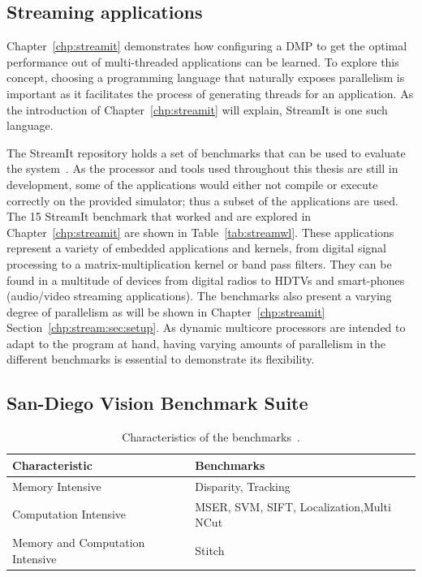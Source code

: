 \subsection{Streaming applications}\label{chp:setup:streamit}

Chapter~\ref{chp:streamit} demonstrates how configuring a DMP to get the optimal performance out of multi-threaded applications can be learned.
To explore this concept, choosing a programming language that naturally exposes parallelism is important as it facilitates the process of generating threads for an application.
As the introduction of Chapter~\ref{chp:streamit} will explain, StreamIt is one such language.

The StreamIt repository holds a set of benchmarks that can be used to evaluate the system~\cite{streamitrepo}.
As the processor and tools used throughout this thesis are still in development, some of the applications would either not compile or execute correctly on the provided simulator; thus a subset of the applications are used.
The 15 StreamIt benchmark that worked and are explored in Chapter~\ref{chp:streamit} are shown in Table~\ref{tab:streamwl}.
These applications represent a variety of embedded applications and kernels, from digital signal processing to a matrix-multiplication kernel or band pass filters.
They can be found in a multitude of devices from digital radios to HDTVs and smart-phones (audio/video streaming applications).
The benchmarks also present a varying degree of parallelism as will be shown in Chapter~\ref{chp:streamit} Section~\ref{chp:stream:sec:setup}.
As dynamic multicore processors are intended to adapt to the program at hand, having varying amounts of parallelism in the different benchmarks is essential to demonstrate its flexibility.

\subsection{San-Diego Vision Benchmark Suite}\label{chp:setup:sdvbs}
\begin{table}[t]
  \smaller
  \centering
 \begin{tabular} { | l | l | }
 \hline
   \cellcolor[gray]{0.7}Characteristic & \cellcolor[gray]{0.7} Benchmarks\\ \hline
    Memory Intensive & Disparity, Tracking\\ \hline
	Computation Intensive & MSER, SVM, SIFT, Localization,Multi NCut\\\hline
	Memory and Computation Intensive & Stitch\\ \hline
   \end{tabular}
  \caption{Characteristics of the benchmarks~\cite{sdvbs}.}\label{tab:sd-vbschar}
\vspace{1em}
  \end{table}
  
